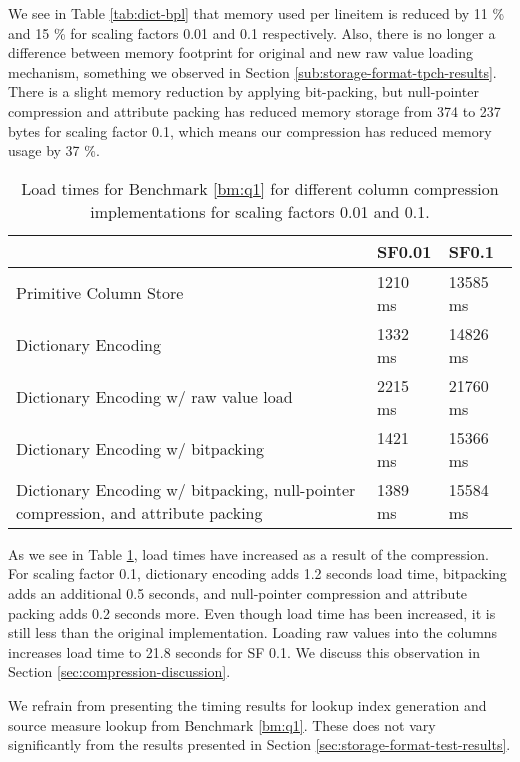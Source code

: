 We see in Table \ref{tab:dict-bpl} that memory used per lineitem is reduced by 11 \% and 15 \% for scaling factors 0.01 and 0.1 respectively. Also, there is no longer a difference between memory footprint for original and new raw value loading mechanism, something we observed in Section \ref{sub:storage-format-tpch-results}. There is a slight memory reduction by applying bit-packing, but null-pointer compression and attribute packing has reduced memory storage from 374 to 237 bytes for scaling factor 0.1, which means our compression has reduced memory usage by 37 \%. 
\begin{table}
    \centering
    \begin{tabularx}{\textwidth}{X | X X}
        & SF0.01 & SF0.1 \\ 
        \hline
        \hline
        Primitive Column Store & 1210 ms & 13585 ms \\
        Dictionary Encoding & 1332 ms & 14826 ms \\
        Dictionary Encoding w/ raw value load & 2215 ms & 21760 ms \\
        Dictionary Encoding w/ bitpacking & 1421 ms &  15366 ms \\
        Dictionary Encoding w/ bitpacking, null-pointer compression, and attribute packing & 1389 ms & 15584 ms \\
    \end{tabularx}
    \caption{Load times for Benchmark \ref{bm:q1} for different column compression implementations for scaling factors 0.01 and 0.1.} 
    \label{tab:dict-load}
\end{table}

As we see in Table \ref{tab:dict-load}, load times have increased as a result of the compression. For scaling factor 0.1, dictionary encoding adds 1.2 seconds load time, bitpacking adds an additional 0.5 seconds, and null-pointer compression and attribute packing adds 0.2 seconds more. Even though load time has been increased, it is still less than the original implementation. Loading raw values into the columns increases load time to 21.8 seconds for SF 0.1. We discuss this observation in Section \ref{sec:compression-discussion}.

We refrain from presenting the timing results for lookup index generation and source measure lookup from Benchmark \ref{bm:q1}. These does not vary significantly from the results presented in Section \ref{sec:storage-format-test-results}.

